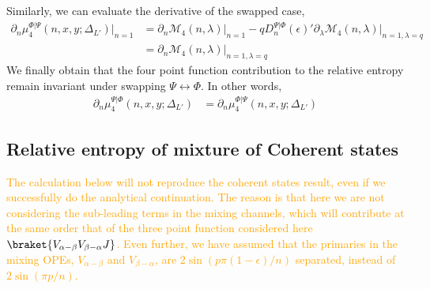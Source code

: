 \documentclass[11pt]{article}
\newcommand{\ep}{\epsilon}
\newcommand{\p}{\partial}
\newcommand{\JM}[1]{\textcolor{orange}{#1}}
\begin{document}
Similarly, we can evaluate the derivative of the swapped case,
\begin{align}
    \p_n \mu_4^{\Phi|\Psi}(n,x,y;\Delta_{L'})\big|_{n=1} &= \p_n\mathcal{M}_4(n,\lambda)\big|_{n=1} - q {D^{\Psi|\Phi}_n(\ep)}'\p_\lambda \mathcal{M}_4(n,\lambda)\Big|_{n=1,\lambda = q}\\
    &= \p_n\mathcal{M}_4(n,\lambda)\big|_{n=1,\lambda = q}
\end{align}
We finally obtain that the four point function contribution to the relative entropy remain invariant under swapping $\Psi \leftrightarrow\Phi$. In other words, 
\begin{align}
    \p_n \mu_4^{\Psi|\Phi}(n,x,y;\Delta_{L'}) &= \p_n \mu_4^{\Phi|\Psi}(n,x,y;\Delta_{L'})
\end{align}
\subsection{Relative entropy of mixture of Coherent states}
\JM{The calculation below will not reproduce the coherent states result, even if we successfully do the analytical continuation. The reason is that here we are not considering the sub-leading terms in the mixing channels, which will contribute at the same order that of the three point function considered here $\braket{V_{\alpha - \beta}V_{\beta - \alpha}J}$. Even further, we have assumed that the primaries in the mixing OPEs, $V_{\alpha-\beta}$ and $V_{\beta-\alpha}$, are $2\sin(p\pi(1-\ep)/n)$ separated, instead of $2\sin(\pi p/n)$.}
\end{document}
